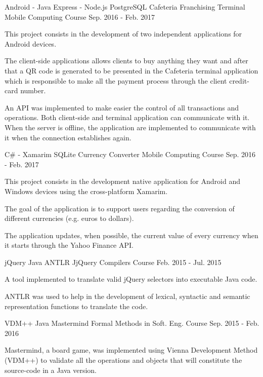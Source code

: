 \begin{cventries}
  \cventry
    {Android - Java \enskip\cdotp\enskip Express - Node.js \enskip\cdotp\enskip PostgreSQL}
    {Cafeteria Franchising Terminal}
    {Mobile Computing Course}
    {Sep. 2016 - Feb. 2017}
    {
      \begin{cvitems}
        \item {This project consists in the development of two independent applications for Android devices.}
        \item{The client-side applications allows clients to buy anything they want and after that a QR code is generated to be presented in the Cafeteria terminal application which is responsible to make all the payment process through the client credit-card number.}
        \item{An API was implemented to make easier the control of all transactions and operations. Both client-side and terminal application can communicate with it. When the server is offline, the application are implemented to communicate with it when the connection establishes again. }
      \end{cvitems}
    }
    
    \cventry
    {C\# - Xamarim \enskip\cdotp\enskip SQLite}
    {Currency Converter}
    {Mobile Computing Course}
    {Sep. 2016 - Feb. 2017}
    {
      \begin{cvitems}
        \item {This project consists in the development native application for Android and Windows devices using the cross-platform Xamarim.}
        \item{The goal of the application is to support users regarding the conversion of different currencies (e.g. euros to dollars).}
        \item{The application updates, when possible, the current value of every currency when it starts through the Yahoo Finance API.}
      \end{cvitems}
    }
    
  \cventry
    {jQuery \enskip\cdotp\enskip Java \enskip\cdotp\enskip ANTLR}
    {JjQuery}
    {Compilers Course}
    {Feb. 2015 - Jul. 2015}
    {
      \begin{cvitems}
        \item {A tool implemented to translate valid jQuery selectors into executable Java code.}
        \item{ANTLR was used to help in the development of lexical, syntactic and semantic representation functions to translate the code.}
      \end{cvitems}
    }
    \cventry
    {VDM++ \enskip\cdotp\enskip Java}
    {Mastermind}
    {Formal Methods in Soft. Eng. Course}
    {Sep. 2015 - Feb. 2016}
    {
      \begin{cvitems}
        \item {Mastermind, a board game, was implemented using Vienna Development Method (VDM++) to validate all the operations and objects that will constitute the source-code in a Java version.}
      \end{cvitems}
    }
    

\end{cventries}
